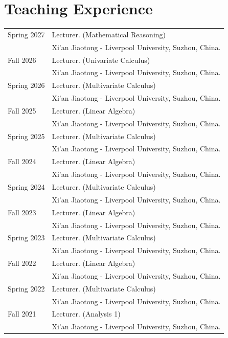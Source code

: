 \documentclass[a4paper,12pt]{article}
\begin{document}
\section*{\Large{Teaching Experience}}
\begin{tabular}{@{}p{1.4in}p{4.5in}} 
Spring 2027 & Lecturer. (Mathematical Reasoning) \\
             & Xi'an Jiaotong - Liverpool University, Suzhou, China.   \\
Fall 2026 & Lecturer. (Univariate Calculus) \\
             & Xi'an Jiaotong - Liverpool University, Suzhou, China.   \\
Spring 2026 & Lecturer. (Multivariate Calculus) \\
             & Xi'an Jiaotong - Liverpool University, Suzhou, China.   \\
Fall 2025 & Lecturer. (Linear Algebra) \\
             & Xi'an Jiaotong - Liverpool University, Suzhou, China.   \\
Spring 2025 & Lecturer. (Multivariate Calculus) \\
             & Xi'an Jiaotong - Liverpool University, Suzhou, China.   \\
Fall 2024 & Lecturer. (Linear Algebra) \\
             & Xi'an Jiaotong - Liverpool University, Suzhou, China.   \\
Spring 2024 & Lecturer. (Multivariate Calculus) \\
             & Xi'an Jiaotong - Liverpool University, Suzhou, China.   \\
Fall 2023 & Lecturer. (Linear Algebra) \\
             & Xi'an Jiaotong - Liverpool University, Suzhou, China.   \\
Spring 2023 & Lecturer. (Multivariate Calculus) \\
             & Xi'an Jiaotong - Liverpool University, Suzhou, China.   \\
Fall 2022 & Lecturer. (Linear Algebra) \\
             & Xi'an Jiaotong - Liverpool University, Suzhou, China.   \\
Spring 2022 & Lecturer. (Multivariate Calculus) \\
             & Xi'an Jiaotong - Liverpool University, Suzhou, China.   \\
Fall 2021 & Lecturer. (Analysis 1) \\
               & Xi'an Jiaotong - Liverpool University, Suzhou, China.   \\

\end{tabular}
\end{document}
